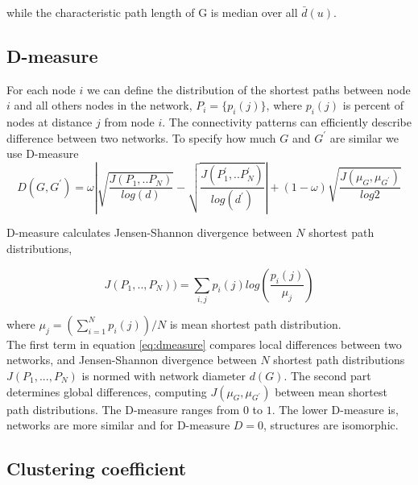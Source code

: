  while the characteristic path length of G is median over all $\bar{d}(u)$.


\subsection{D-measure}


For each node $i$ we can define the distribution of the shortest paths between node $i$ and all others nodes in the network, $P_{i}=\{p_{i}(j)\}$, where $p_{i}(j)$ is percent of nodes at distance $j$ from node $i$. The connectivity patterns can efficiently describe difference between two networks.    
To specify how much $G$ and $G^{'}$ are similar we use D-measure \cite{tiago2}
\begin{equation}
D(G, G^{'}) = \omega \left| \sqrt{\frac{J(P_1,..P_N)}{log(d)}}-\sqrt{\frac{J(P_1^{'},..P_N^{'})}{log(d^{'})}} \right| + (1-\omega) \sqrt{\frac{J(\mu_{G},\mu_{G^{'}})}{log2}}
\label{eq:dmeasure}
\end{equation}

D-measure calculates Jensen-Shannon divergence between $N$ shortest path distributions,

\begin{equation}
J(P_1,.., P_N)) = \sum_{i,j}p_i(j)log(\frac{p_i(j)}{\mu_j})
\end{equation}

where  $\mu_j = (\sum_{i=1}^N p_i(j))/N$ is mean shortest path distribution. \\

The first term in equation \ref{eq:dmeasure} compares local differences between two networks, and Jensen-Shannon divergence between $N$ shortest path distributions $J(P_{1},...,P_{N})$ is normed with network diameter $d(G)$. The second part determines global differences, computing  ${J(\mu_{G},\mu_{G^{'}})}$ between mean shortest path distributions. 
The D-measure ranges from $0$ to $1$. The lower D-measure is, networks are more similar and for D-measure $D = 0$, structures are isomorphic.


\subsection{Clustering coefficient}



